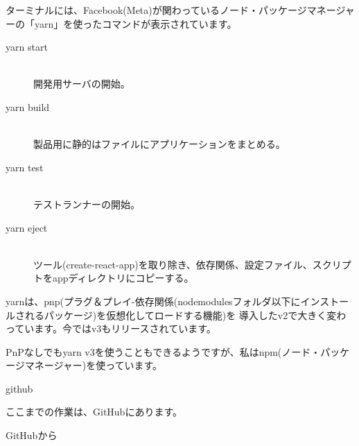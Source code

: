 \def\startercodeblockfontsize{}
\begin{starterterminal}[]{}\end{starterterminal}
\begin{starterquote}

ターミナルには、Facebook(Meta)が関わっているノード・パッケージマネージャーの「yarn」を使ったコマンドが表示されています。

\begin{description}
\item[yarn start] \mbox{} \\
開発用サーバの開始。
\item[yarn build] \mbox{} \\
製品用に静的はファイルにアプリケーションをまとめる。
\item[yarn test] \mbox{} \\
テストランナーの開始。
\item[yarn eject] \mbox{} \\
ツール(create{-}react{-}app)を取り除き、依存関係、設定ファイル、スクリプトをappディレクトリにコピーする。
\end{description}

\vspace*{\baselineskip}

yarnは、pnp(プラグ＆プレイ{-}依存関係(node\textunderscore{}modulesフォルダ以下にインストールされるパッケージ)を仮想化してロードする機能)を
導入したv2で大きく変わっています。今ではv3もリリースされています。

\vspace*{\baselineskip}

PnPなしでもyarn v3を使うこともできるようですが、私はnpm(ノード・パッケージマネージャー)を使っています。

\end{starterquote}
\begin{starternote}[]{github}

ここまでの作業は、GitHubにあります。

\def\startercodeblockfontsize{}
\begin{starterterminal}[]{GitHubから}\end{starterterminal}
\end{starternote}

